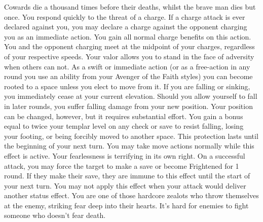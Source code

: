 \begin{optional}
{Cowards die a thousand times before their deaths, whilst the brave man dies but once.}
{You respond quickly to the threat of a charge. If a charge attack is ever declared against you, you may declare a charge against the opponent charging you as an immediate action. You gain all normal charge benefits on this action. You and the opponent charging meet at the midpoint of your charges, regardless of your respective speeds.}
{Your valor allows you to stand in the face of adversity when others can not. As a swift or immediate action (or as a free-action in any round you use an ability from your Avenger of the Faith styles) you can become rooted to a space unless you elect to move from it. If you are falling or sinking, you immediately cease at your current elevation. Should you allow yourself to fall in later rounds, you suffer falling damage from your new position. Your position can be changed, however, but it requires substantial effort. You gain a bonus equal to twice your templar level on any check or save to resist falling, losing your footing, or being forcibly moved to another space. This protection lasts until the beginning of your next turn. You may take move actions normally while this effect is active.}
{Your fearlessness is terrifying in its own right. On a successful attack, you may force the target to make a save or become Frightened for 1 round. If they make their save, they are immune to this effect until the start of your next turn. You may not apply this effect when your attack would deliver another status effect.}
{You are one of those hardcore zealots who throw themselves at the enemy, striking fear deep into their hearts. It's hard for enemies to fight someone who doesn't fear death.}
\end{optional}

